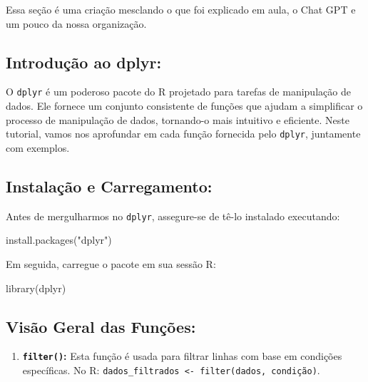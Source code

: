 \documentclass[
  letterpaper,
  DIV=11,
  numbers=noendperiod]{scrreprt}
\newenvironment{Shaded}{\begin{snugshade}}{\end{snugshade}}
\newcommand{\FunctionTok}[1]{\textcolor[rgb]{0.28,0.35,0.67}{#1}}
\newcommand{\NormalTok}[1]{\textcolor[rgb]{0.00,0.23,0.31}{#1}}
\newcommand{\StringTok}[1]{\textcolor[rgb]{0.13,0.47,0.30}{#1}}
\providecommand{\tightlist}{%
  \setlength{\itemsep}{0pt}\setlength{\parskip}{0pt}}
\begin{document}
Essa seção é uma criação mesclando o que foi explicado em aula, o Chat
GPT e um pouco da nossa organização.

\subsection{Introdução ao dplyr:}\label{introduuxe7uxe3o-ao-dplyr}

O \texttt{dplyr} é um poderoso pacote do R projetado para tarefas de
manipulação de dados. Ele fornece um conjunto consistente de funções que
ajudam a simplificar o processo de manipulação de dados, tornando-o mais
intuitivo e eficiente. Neste tutorial, vamos nos aprofundar em cada
função fornecida pelo \texttt{dplyr}, juntamente com exemplos.

\subsection{Instalação e
Carregamento:}\label{instalauxe7uxe3o-e-carregamento}

Antes de mergulharmos no \texttt{dplyr}, assegure-se de tê-lo instalado
executando:

\begin{Shaded}
\begin{Highlighting}[]
\FunctionTok{install.packages}\NormalTok{(}\StringTok{"dplyr"}\NormalTok{)}
\end{Highlighting}
\end{Shaded}

Em seguida, carregue o pacote em sua sessão R:

\begin{Shaded}
\begin{Highlighting}[]
\FunctionTok{library}\NormalTok{(dplyr)}
\end{Highlighting}
\end{Shaded}

\subsection{Visão Geral das
Funções:}\label{visuxe3o-geral-das-funuxe7uxf5es}

\begin{enumerate}
\def\labelenumi{\arabic{enumi}.}
\tightlist
\item
  \textbf{\texttt{filter()}:} Esta função é usada para filtrar linhas
  com base em condições específicas. No R:
  \texttt{dados\_filtrados\ \textless{}-\ filter(dados,\ condição)}.
\end{enumerate}
\end{document}
